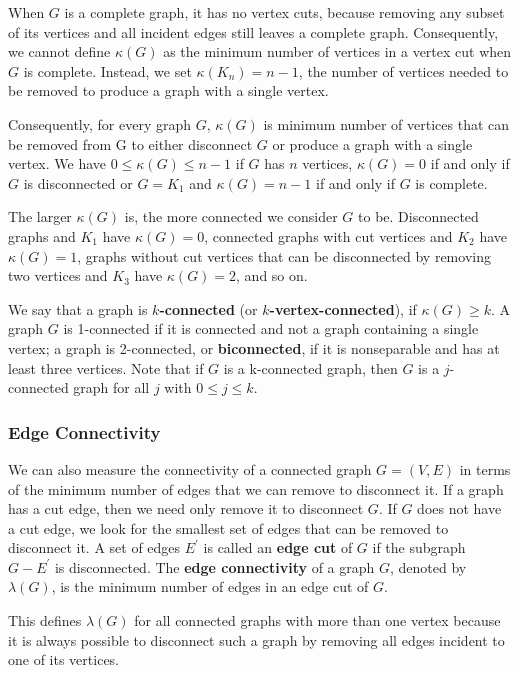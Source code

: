 \documentclass[11pt]{article}
\begin{document}
When $G$ is a complete graph, it has no vertex cuts, because removing any subset of its vertices and all incident edges still leaves a complete graph. Consequently, we cannot define $\kappa(G)$ as the minimum number of vertices in a vertex cut when $G$ is complete. Instead, we set $\kappa(K_n) = n - 1$, the number of vertices needed to be removed to produce a graph with a single vertex.

Consequently, for every graph $G$, $\kappa(G)$ is minimum number of vertices that can be removed from G to either disconnect $G$ or produce a graph with a single vertex. We have $0 \leq \kappa(G) \leq n-1$ if $G$ has $n$ vertices, $\kappa(G) = 0$ if and only if $G$ is disconnected or $G = K_1$ and $\kappa(G) = n-1$ if and only if $G$ is complete.

The larger $\kappa(G)$ is, the more connected we consider $G$ to be. Disconnected graphs and $K_1$ have $\kappa(G) = 0$, connected graphs with cut vertices and $K_2$ have $\kappa(G) = 1$, graphs without cut vertices that can be disconnected by removing two vertices and $K_3$ have $\kappa(G) = 2$, and so on.

We say that a graph is \textbf{$k$-connected} (or \textbf{$k$-vertex-connected}), if $\kappa(G) \geq k$. A graph $G$ is 1-connected if it is connected and not a graph containing a single vertex; a graph is 2-connected, or \textbf{biconnected}, if it is nonseparable and has at least three vertices. Note that if $G$ is a k-connected graph, then $G$ is a $j$-connected graph for all $j$ with $0 \leq j \leq k$.

\subsubsection{Edge Connectivity}

We can also measure the connectivity of a connected graph $G = (V, E)$ in terms of the minimum number of edges that we can remove to disconnect it. If a graph
has a cut edge, then we need only remove it to disconnect $G$. If $G$ does not have a cut edge, we look for the smallest set of edges that can be removed to disconnect it. A set of edges $E^{'}$ is called an \textbf{edge cut} of $G$ if the subgraph $G - E^{'}$ is disconnected. The \textbf{edge connectivity} of a graph $G$, denoted by $\lambda(G)$, is the minimum number of edges in an edge cut of $G$. 

This defines $\lambda(G)$ for all connected graphs with more than one vertex because it is always possible to disconnect such a graph by removing all edges incident to one of its vertices. 
\end{document}
